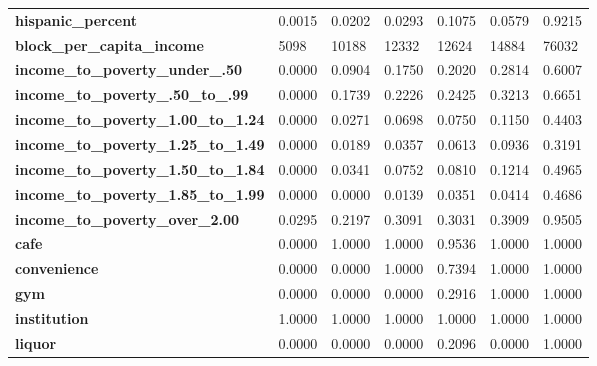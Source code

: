 \documentclass{article}
\begin{document}
\begin{table}[H]
\begin{center}
\begin{tabular}{lllllll}
\textbf{hispanic\_percent}   & 0.0015        & 0.0202           & 0.0293          & 0.1075        & 0.0579           & 0.9215   \\
\textbf{block\_per\_capita\_income}          & 5098          & 10188            & 12332           & 12624         & 14884            & 76032         \\
\textbf{income\_to\_poverty\_under\_.50}     & 0.0000        & 0.0904           & 0.1750          & 0.2020        & 0.2814           & 0.6007        \\
\textbf{income\_to\_poverty\_.50\_to\_.99}   & 0.0000        & 0.1739           & 0.2226          & 0.2425        & 0.3213           & 0.6651        \\
\textbf{income\_to\_poverty\_1.00\_to\_1.24} & 0.0000        & 0.0271           & 0.0698          & 0.0750        & 0.1150           & 0.4403        \\
\textbf{income\_to\_poverty\_1.25\_to\_1.49} & 0.0000        & 0.0189           & 0.0357          & 0.0613        & 0.0936           & 0.3191        \\
\textbf{income\_to\_poverty\_1.50\_to\_1.84} & 0.0000        & 0.0341           & 0.0752          & 0.0810        & 0.1214           & 0.4965        \\
\textbf{income\_to\_poverty\_1.85\_to\_1.99} & 0.0000        & 0.0000           & 0.0139          & 0.0351        & 0.0414           & 0.4686        \\
\textbf{income\_to\_poverty\_over\_2.00}     & 0.0295        & 0.2197           & 0.3091          & 0.3031        & 0.3909           & 0.9505        \\
\textbf{cafe}                                & 0.0000        & 1.0000           & 1.0000          & 0.9536        & 1.0000           & 1.0000        \\
\textbf{convenience}                         & 0.0000        & 0.0000           & 1.0000          & 0.7394        & 1.0000           & 1.0000        \\
\textbf{gym}                                 & 0.0000        & 0.0000           & 0.0000          & 0.2916        & 1.0000           & 1.0000        \\
\textbf{institution}                         & 1.0000        & 1.0000           & 1.0000          & 1.0000        & 1.0000           & 1.0000        \\
\textbf{liquor}                              & 0.0000        & 0.0000           & 0.0000          & 0.2096        & 0.0000           & 1.0000        \\

\end{tabular}
\end{center}
\end{table}
\end{document}

